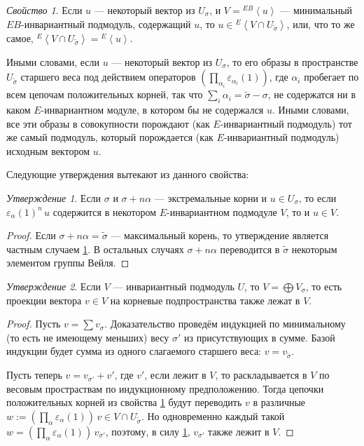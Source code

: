 \documentclass[10pt]{article}
\theoremstyle{break}
\theoremstyle{remark}
\newtheorem{prop}{Утверждение}
\newtheorem{hyp}{Свойство}
\begin{document}
\begin{hyp}\label{returnfromhighest}
Если $u$ --- некоторый вектор из $U_\sigma$, и $V={}^{EB}\left<u\right>$ --- минимальный $EB$-инвариантный подмодуль, содержащий $u$, то $u \in {}^E\left<V \cap U_{\widetilde\sigma}\right>$, или, что то же самое, ${}^E\left<V \cap U_{\widetilde\sigma}\right> = {}^E \left<u\right>$.

Иными словами, если $u$ --- некоторый вектор из $U_\sigma$, то его образы в пространстве $U_{\widetilde\sigma}$ старшего веса под действием операторов 
$\left(\prod_{\alpha_i}\varepsilon_{\alpha_i}(1)\right)$, где $\alpha_i$ пробегает по всем цепочам положительных корней, так что $\sum_i \alpha_i = \widetilde\sigma - \sigma$, не содержатся ни в каком $E$-инвариантном модуле, в котором бы не содержался $u$. Иными словами, все эти образы в совокупности порождают (как $E$-инвариантный подмодуль) тот же самый подмодуль, который порождается (как $E$-инвариантный подмодуль) исходным вектором $u$.
\end{hyp}

Следующие утверждения вытекают из данного свойства:

\begin{prop} \label{extremalweightisomorphism}
Если $\sigma$ и $\sigma+n\alpha$ --- экстремальные корни и $u\in U_\sigma$, то
если $\varepsilon_\alpha(1)^n \, u $ содержится в некотором $E$-инвариантном подмодуле $V$, то и $u \in V$.
\end{prop}
\begin{proof}
Если $\sigma+n\alpha = \widetilde\sigma$ --- максимальный корень, то утверждение является частным случаем \ref{returnfromhighest}. В остальных случаях $\sigma+n\alpha$ переводится в $\widetilde\sigma$ некоторым элементом группы Вейля.
\end{proof}

\begin{prop}\label{weightprojections}
Если $V$ --- инвариантный подмодуль $U$, то $V = \bigoplus V_\sigma$, то есть проекции вектора $v \in V$ на корневые подпространства также лежат в $V$.
\end{prop}
\begin{proof}
Пусть $v = \sum v_\sigma$. Доказательство проведём индукцией по минимальному (то есть не имеющему меньших) весу $\sigma'$ из присутствующих в сумме. Базой индукции будет сумма из одного слагаемого старшего веса: $v = v_{\widetilde\sigma}$.

Пусть теперь $v = v_{\sigma'} + v'$, где $v'$, если лежит в $V$, то раскладывается в $V$ по весовым простраствам по индукционному предположению. Тогда цепочки положительных корней из свойства \ref{returnfromhighest} будут переводить $v$ в различные $w := \left(\prod_{\alpha}\varepsilon_\alpha(1)\right) \, v \in V \cap U_{\widetilde\sigma}$. Но одновременно каждый такой $w = \left(\prod_{\alpha}\varepsilon_\alpha(1)\right) \, v_{\sigma'}$, поэтому, в силу \ref{returnfromhighest}, $v_{\sigma'}$ также лежит в $V$.
\end{proof}
\end{document}
